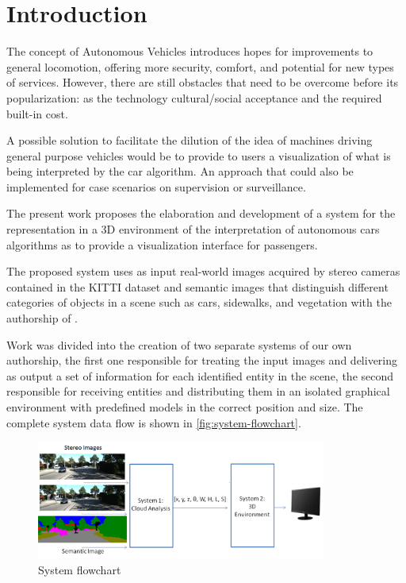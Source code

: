 
\chapter[Introduction]{Introduction}


    The concept of Autonomous Vehicles introduces hopes for improvements to general locomotion, offering more security, comfort, and potential for new types of services. However, there are still obstacles that need to be overcome before its popularization: as the technology cultural/social acceptance and the required built-in cost.

    A possible solution to facilitate the dilution of the idea of machines driving general purpose vehicles would be to provide to users a visualization of what is being interpreted by the car algorithm. An approach that could also be implemented for case scenarios on supervision or surveillance. 

    The present work proposes the elaboration and development of a system for the representation in a 3D environment of the interpretation of autonomous cars algorithms as to provide a visualization interface for passengers.
    
    The proposed system uses as input real-world images acquired by stereo cameras contained in the KITTI dataset \cite{Geiger2013IJRR} and semantic images that distinguish different categories of objects in a scene such as cars, sidewalks, and vegetation with the authorship of \cite{giovaniThesis}. 
    
    Work was divided into the creation of two separate systems of our own authorship, the first one responsible for treating the input images and delivering as output a set of information for each identified entity in the scene, the second responsible for receiving entities and distributing them in an isolated graphical environment with predefined models in the correct position and size. The complete system data flow is shown in \autoref{fig:system-flowchart}.
        
    \begin{figure}[H]
         \caption{\label{fig:system-flowchart}System flowchart}
         \begin{center}
            \includegraphics[width=0.85\textwidth]{images/proposed-system-flow-chart.png}
         \end{center}
    \end{figure}
    
